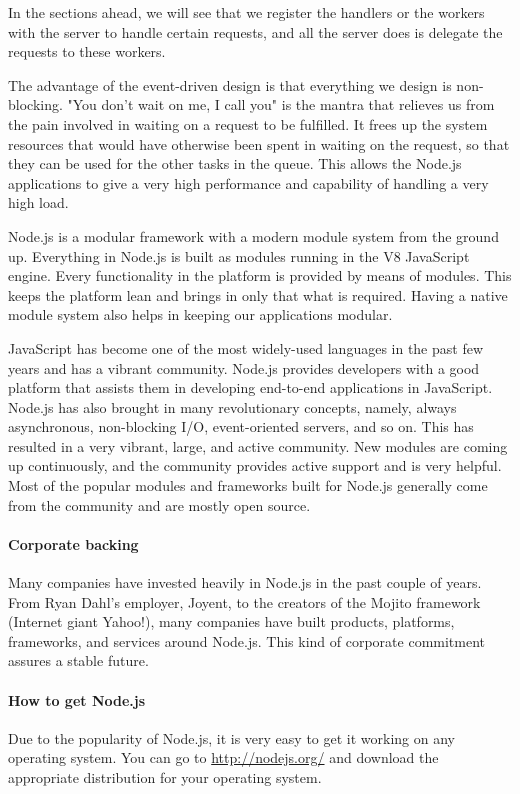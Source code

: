 In the sections ahead, we will see that we register the handlers or the workers with
the server to handle certain requests, and all the server does is delegate the requests
to these workers.\cite{16}

The advantage of the event-driven design is that everything we design is
non-blocking. "You don't wait on me, I call you" is the mantra that relieves us from
the pain involved in waiting on a request to be fulfilled. It frees up the system
resources that would have otherwise been spent in waiting on the request, so that
they can be used for the other tasks in the queue. This allows the Node.js applications
to give a very high performance and capability of handling a very high load.\cite{16}

Node.js is a modular framework with a modern module system from the ground
up. Everything in Node.js is built as modules running in the V8 JavaScript engine.
Every functionality in the platform is provided by means of modules. This keeps
the platform lean and brings in only that what is required. Having a native module
system also helps in keeping our applications modular.\cite{16}

JavaScript has become one of the most widely-used languages in the past few years
and has a vibrant community. Node.js provides developers with a good platform
that assists them in developing end-to-end applications in JavaScript. Node.js has
also brought in many revolutionary concepts, namely, always asynchronous,
non-blocking I/O, event-oriented servers, and so on. This has resulted in a very
vibrant, large, and active community. New modules are coming up continuously,
and the community provides active support and is very helpful. Most of the popular
modules and frameworks built for Node.js generally come from the community and
are mostly open source.\cite{16}

\paragraph*{Corporate backing}
\hfill \break
Many companies have invested heavily in Node.js in the past couple of years. From
Ryan Dahl's employer, Joyent, to the creators of the Mojito framework (Internet giant
Yahoo!), many companies have built products, platforms, frameworks, and services
around Node.js. This kind of corporate commitment assures a stable future.\cite{16}

\paragraph*{How to get Node.js}
\hfill \break
Due to the popularity of Node.js, it is very easy to get it working on any operating
system. You can go to \href{http://nodejs.org/}{http://nodejs.org/} and download the appropriate
distribution for your operating system. \cite{16}

